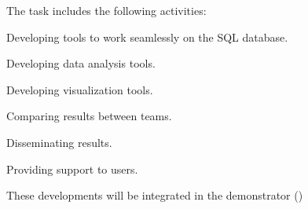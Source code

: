 \begin{task}[
  title=Nuclear Medicine application,
  id=opendose-analysis,
  lead=INSERM,
  PM=24,
  wphases={0-48},
  partners={INSERM}
]
  The task includes the following activities:
  \begin{compactitem}
  \item Developing tools to work seamlessly on the SQL database.
  \item Developing data analysis tools.
  \item Developing visualization tools.
  \item Comparing results between teams.
  \item Disseminating results.
  \item Providing support to users.
  \end{compactitem}
  These developments will be integrated in the demonstrator
  ()

\end{task}
